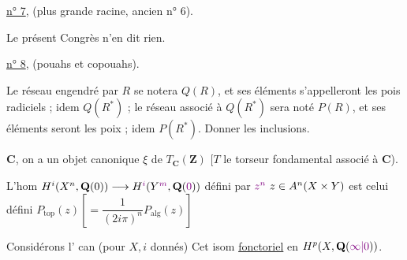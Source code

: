 \uline{n° 7}, (plus grande racine, ancien n° 6).

Le présent Congrès n'en dit rien.

\uline{n° 8}, (pouahs et copouahs).

Le réseau engendré par $R$ se notera $Q(R)$, et ses éléments s'appelleront les pois radiciels ; idem $Q(R^*)$ ; le réseau associé à $Q(R^*)$ sera noté $P(R)$, et ses éléments seront les poix ; idem $P(R^*)$. Donner les inclusions.


$\mathbf C$, on a un objet canonique  $\xi$ de $T_{\mathbf C}(\mathbf Z)$
[$T$ le torseur fondamental associé à $\mathbf C$).


L'hom $H^i(X^n,\mathbf Q(0))\longrightarrow H^{\unsure{i}}(Y^{\unsure{m}},\mathbf Q(\unsure{0}))$ défini par $\deleted{\unsure{z^n}}\ z\in A^n(X\times Y)$ est celui défini   $P_{\mathrm{top}}(z)\left[=\dfrac{1}{(2i\pi)^n}P_{\mathrm{alg}}(z)\right]$
\inserted{\[
\boxed{\xi(z)(x)=\operatorname{pr}_{2*}^{\unsure{\mathrm{an}|\mathrm{top}}}\bigl(\operatorname{pr}_1^*(x)P_{\mathrm{top}}(z)\bigr)}
\]}

Considérons l' can (pour $X,i$ donnés)
Cet isom \uline{   fonctoriel} en $H^p(X,\mathbf Q(\unsure{\infty|0}))$.

